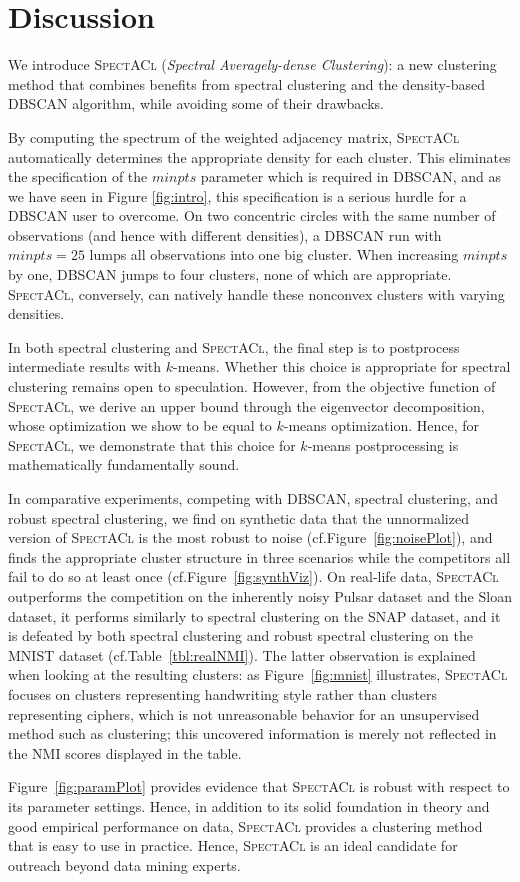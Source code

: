 \section{Discussion}
We introduce \textsc{SpectACl} (\emph{Spectral Averagely-dense Clustering}): a new clustering method that combines benefits from spectral clustering and the density-based DBSCAN algorithm, while avoiding some of their drawbacks. 

By computing the spectrum of the weighted adjacency matrix, \textsc{SpectACl} automatically determines the appropriate density for each cluster.  This eliminates the specification of the $minpts$ parameter which is required in DBSCAN, and as we have seen in Figure \ref{fig:intro}, this specification is a serious hurdle for a DBSCAN user to overcome. On two concentric circles with the same number of observations (and hence with different densities), a DBSCAN run with $minpts=25$ lumps all observations into one big cluster.  When increasing $minpts$ by one, DBSCAN jumps to four clusters, none of which are appropriate. \textsc{SpectACl}, conversely, can natively handle these nonconvex clusters with varying densities.

In both spectral clustering and \textsc{SpectACl}, the final step is to postprocess intermediate results with $k$-means. Whether this choice is appropriate for spectral clustering remains open to speculation.  However, from the objective function of \textsc{SpectACl}, we derive an upper bound through the eigenvector decomposition, whose optimization we show to be equal to $k$-means optimization.  Hence, for \textsc{SpectACl}, we demonstrate that this choice for $k$-means postprocessing is mathematically fundamentally sound.

In comparative experiments, competing with DBSCAN, spectral clustering, and robust spectral clustering, we find on synthetic data that the unnormalized version of \textsc{SpectACl} is the most robust to noise (cf.\@ Figure~\ref{fig:noisePlot}), and finds the appropriate cluster structure in three scenarios while the competitors all fail to do so at least once (cf.\@ Figure~\ref{fig:synthViz}).  On real-life data, \textsc{SpectACl} outperforms the competition on the inherently noisy Pulsar dataset and the Sloan dataset, it performs similarly to spectral clustering on the SNAP dataset, and it is defeated by both spectral clustering and robust spectral clustering on the MNIST dataset (cf.\@ Table~\ref{tbl:realNMI}). The latter observation is explained when looking at the resulting clusters: as Figure~\ref{fig:mnist} illustrates, \textsc{SpectACl} focuses on clusters representing handwriting style rather than clusters representing ciphers, which is not unreasonable behavior for an unsupervised method such as clustering; this uncovered information is merely not reflected in the NMI scores displayed in the table.

Figure~\ref{fig:paramPlot} provides evidence that \textsc{SpectACl} is robust with respect to its parameter settings.  Hence, in addition to its solid foundation in theory and good empirical performance on data, \textsc{SpectACl} provides a clustering method that is easy to use in practice.  Hence, \textsc{SpectACl} is an ideal candidate for outreach beyond data mining experts.
